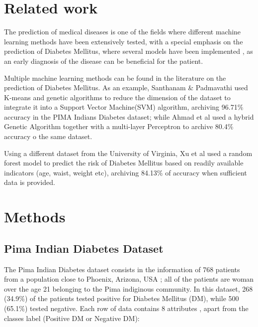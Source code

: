 \documentclass[10pt,twocolumn,letterpaper]{article}
\begin{document}

\section{Related work}


The prediction of medical diseases is one of the fields where different machine learning methods have been extensively tested, with a special emphasis on the prediction of Diabetes Mellitus, where several models have been implemented \cite{Xu2017,Ahmad2013,Santhanam2015,Wu2018}, as an early diagnosis of the disease can be beneficial for the patient.

Multiple machine learning methods can be found in the literature on the prediction of Diabetes Mellitus. As an example, Santhanam \& Padmavathi \cite{Santhanam2015} used K-means and genetic algorithms to reduce the dimension of the dataset to integrate it into a Support Vector Machine(SVM) algorithm, archiving 96.71\% accuracy in the PIMA Indians Diabetes dataset; while Ahmad et al \cite{Ahmad2013} used a hybrid Genetic Algorithm together with a multi-layer Perceptron to archive 80.4\% accuracy o the same dataset.

Using a different dataset from the University of Virginia, Xu et al \cite{Xu2017} used a random forest model to predict the risk of Diabetes Mellitus based on readily available indicators (age, waist, weight etc), archiving 84.13\% of accuracy when sufficient data is provided.


\section{Methods}

\subsection{Pima Indian Diabetes Dataset}

The Pima Indian Diabetes dataset consists in the information of 768 patients from a population close to Phoenix, Arizona, USA \cite{Wu2018}; all of the patients are woman over the age 21 \cite{Xu2017} belonging to the Pima indiginous community. In this dataset, 268 (34.9\%) of the patients tested positive for Diabetes Mellitus (DM), while 500 (65.1\%) tested negative. Each row of data contains 8 attributes \cite{Wu2018}, apart from the classes label (Positive DM or Negative DM):
\end{document}
